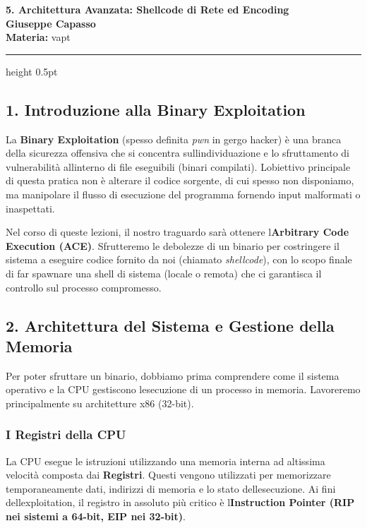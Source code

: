\documentclass[11pt,a4paper]{article}
\newcommand{\proposaltitle}[1]{
    \begin{center}
        \vspace*{0.1cm}
        {\LARGE \bfseries \color{blue} #1} \\[1.5ex]
        {\large \textbf{Giuseppe Capasso}} \\[1ex]
                \small{
            \vspace{0.1cm}
            \textbf{Materia:} vapt\\
        }
            \end{center}
    \vspace{0.3cm}
    \hrule height 0.5pt
    \vspace{0.5cm}
}
\begin{document}
\proposaltitle{5. Architettura Avanzata: Shellcode di Rete ed Encoding}

\subsection{1. Introduzione alla Binary
Exploitation}\label{introduzione-alla-binary-exploitation}

La \textbf{Binary Exploitation} (spesso definita \emph{pwn} in gergo
hacker) è una branca della sicurezza offensiva che si concentra
sull\textquotesingle individuazione e lo sfruttamento di vulnerabilità
all\textquotesingle interno di file eseguibili (binari compilati).
L\textquotesingle obiettivo principale di questa pratica non è alterare
il codice sorgente, di cui spesso non disponiamo, ma manipolare il
flusso di esecuzione del programma fornendo input malformati o
inaspettati.

Nel corso di queste lezioni, il nostro traguardo sarà ottenere
l\textquotesingle{}\textbf{Arbitrary Code Execution (ACE)}. Sfrutteremo
le debolezze di un binario per costringere il sistema a eseguire codice
fornito da noi (chiamato \emph{shellcode}), con lo scopo finale di far
spawnare una shell di sistema (locale o remota) che ci garantisca il
controllo sul processo compromesso.

\subsection{2. Architettura del Sistema e Gestione della
Memoria}\label{architettura-del-sistema-e-gestione-della-memoria}

Per poter sfruttare un binario, dobbiamo prima comprendere come il
sistema operativo e la CPU gestiscono l\textquotesingle esecuzione di un
processo in memoria. Lavoreremo principalmente su architetture x86
(32-bit).

\subsubsection{I Registri della CPU}\label{i-registri-della-cpu}

La CPU esegue le istruzioni utilizzando una memoria interna ad altissima
velocità composta dai \textbf{Registri}. Questi vengono utilizzati per
memorizzare temporaneamente dati, indirizzi di memoria e lo stato
dell\textquotesingle esecuzione. Ai fini
dell\textquotesingle exploitation, il registro in assoluto più critico è
l\textquotesingle{}\textbf{Instruction Pointer (RIP nei sistemi a
64-bit, EIP nei 32-bit)}.
\end{document}
